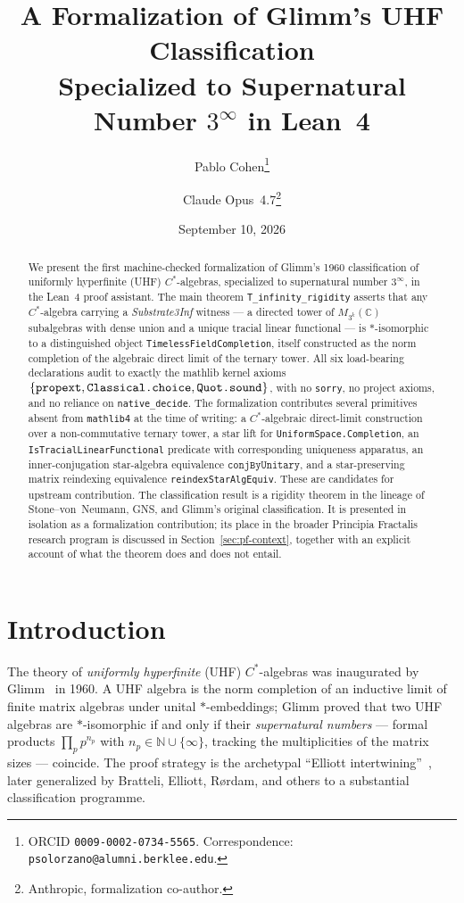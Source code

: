 \documentclass[11pt,a4paper]{article}
\title{A Formalization of Glimm's UHF Classification\\ Specialized to Supernatural Number $3^{\infty}$ in Lean~4}
\author[1]{Pablo Cohen\thanks{ORCID \texttt{0009-0002-0734-5565}. Correspondence: \texttt{psolorzano@alumni.berklee.edu}.}}
\author[2]{Claude Opus~4.7\thanks{Anthropic, formalization co-author.}}
\affil[1]{FractalDevTeam \& Principia Fractalis Research Program}
\affil[2]{Anthropic}
\date{September 10, 2026}
\theoremstyle{plain}
\theoremstyle{definition}
\begin{document}
\maketitle

\begin{abstract}
We present the first machine-checked formalization of Glimm's 1960 classification of uniformly hyperfinite (UHF) $C^{\ast}$-algebras, specialized to supernatural number $3^{\infty}$, in the Lean~4 proof assistant. The main theorem \texttt{T\_infinity\_rigidity} asserts that any $C^{\ast}$-algebra carrying a \emph{Substrate3Inf} witness --- a directed tower of $M_{3^k}(\mathbb{C})$ subalgebras with dense union and a unique tracial linear functional --- is $\ast$-isomorphic to a distinguished object \texttt{TimelessFieldCompletion}, itself constructed as the norm completion of the algebraic direct limit of the ternary tower. All six load-bearing declarations audit to exactly the mathlib kernel axioms $\{\textnormal{\texttt{propext}}, \textnormal{\texttt{Classical.choice}}, \textnormal{\texttt{Quot.sound}}\}$, with no \texttt{sorry}, no project axioms, and no reliance on \texttt{native\_decide}. The formalization contributes several primitives absent from \texttt{mathlib4} at the time of writing: a $C^{\ast}$-algebraic direct-limit construction over a non-commutative ternary tower, a star lift for \texttt{UniformSpace.Completion}, an \texttt{IsTracialLinearFunctional} predicate with corresponding uniqueness apparatus, an inner-conjugation star-algebra equivalence $\texttt{conjByUnitary}$, and a star-preserving matrix reindexing equivalence \texttt{reindexStarAlgEquiv}. These are candidates for upstream contribution. The classification result is a rigidity theorem in the lineage of Stone--von~Neumann, GNS, and Glimm's original classification. It is presented in isolation as a formalization contribution; its place in the broader Principia Fractalis research program is discussed in Section~\ref{sec:pf-context}, together with an explicit account of what the theorem does and does not entail.
\end{abstract}

\section{Introduction}
\label{sec:intro}

The theory of \emph{uniformly hyperfinite} (UHF) $C^{\ast}$-algebras was inaugurated by Glimm~\cite{glimm1960} in 1960. A UHF algebra is the norm completion of an inductive limit of finite matrix algebras under unital $\ast$-embeddings; Glimm proved that two UHF algebras are $\ast$-isomorphic if and only if their \emph{supernatural numbers} --- formal products $\prod_p p^{n_p}$ with $n_p \in \mathbb{N} \cup \{\infty\}$, tracking the multiplicities of the matrix sizes --- coincide. The proof strategy is the archetypal ``Elliott intertwining''~\cite{elliott1976}, later generalized by Bratteli, Elliott, R{\o}rdam, and others to a substantial classification programme.
\end{document}
